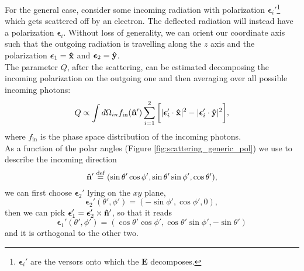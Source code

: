 For the general case, consider some incoming radiation with polarization $\boldsymbol{\epsilon}_i'$\footnote{$\boldsymbol{\epsilon}_i'$ are the versors onto which the $\mathbf{E}$ decomposes.} which gets scattered off by an electron. The deflected radiation will instead have a polarization $\boldsymbol{\epsilon}_i$. Without loss of generality, we can orient our coordinate axis such that the outgoing radiation is travelling along the $z$ axis and the polarization $\boldsymbol{\epsilon}_1=\mathbf{\hat{x}}$ and $\boldsymbol{\epsilon}_2=\mathbf{\hat{y}}$.\\
The parameter $Q$, after the scattering, can be estimated decomposing the incoming polarization on the outgoing one and then averaging over all possible incoming photons:
$$Q\propto\int d\Omega_{in} f_{\text{in}}(\mathbf{\hat{n}}')\sum_{i=1}^{2}\bigg[|\boldsymbol{\epsilon}_{i}'\cdot\mathbf{\hat{x}}|^2-|\boldsymbol{\epsilon}_{i}'\cdot\mathbf{\hat{y}}|^2\bigg],$$
where $f_{\text{in}}$ is the phase space distribution of the incoming photons.\\
As a function of the polar angles (Figure \ref{fig:scattering_generic_pol}) we use to describe the incoming direction $$\mathbf{\hat{n}}'\stackrel{\text{def}}{=}(\sin\theta'\cos\phi',\sin\theta'\sin\phi',\cos\theta'),$$ we can first choose $\boldsymbol{\epsilon}_2'$ lying on the $xy$ plane,
$$\boldsymbol{\epsilon}_2'(\theta',\phi') =(-\sin\phi',\cos\phi',0),$$ then we can pick $\boldsymbol{\epsilon}_1'=\boldsymbol{\epsilon}_2'\times\mathbf{\hat{n}}'$, so that it reads
$$
    \boldsymbol{\epsilon}_1'(\theta',\phi') =(\cos\theta'\cos\phi',\cos\theta'\sin\phi',-\sin\theta')
$$ 
and it is orthogonal to the other two.
